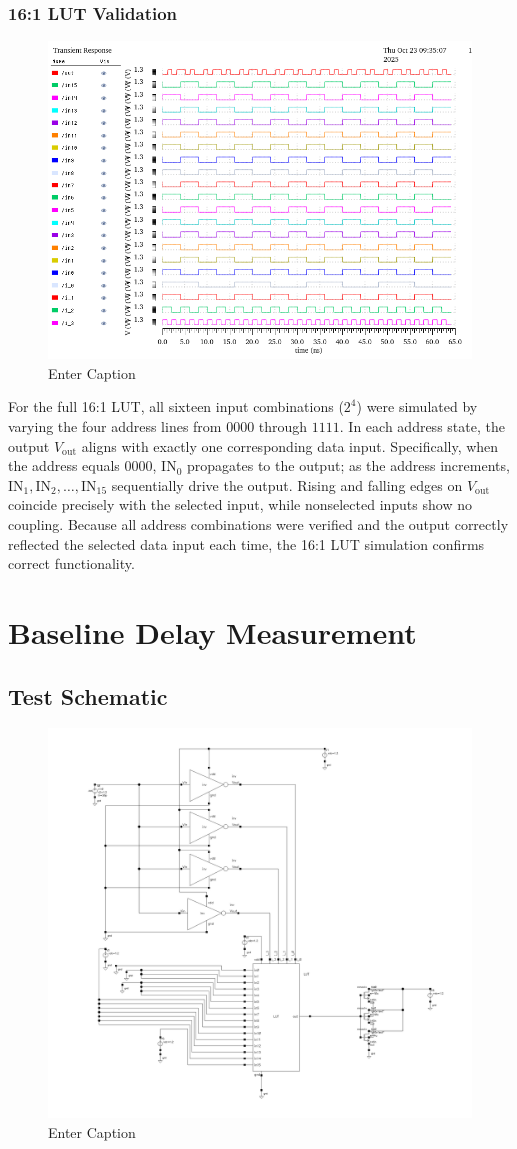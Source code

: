 \documentclass[12pt]{article}
\begin{document}
\subsubsection*{16:1 LUT Validation}
\begin{figure}[H]
    \centering
    \includegraphics[width=0.5\linewidth]{writeup//figures/lutval.png}
    \caption{Enter Caption}
\end{figure}

For the full 16:1 LUT, all sixteen input combinations (\(2^4\)) were simulated by varying the four address lines from \(0000\) through \(1111\). 
In each address state, the output \(V_{\text{out}}\) aligns with exactly one corresponding data input. 
Specifically, when the address equals \(0000\), \(\text{IN}_0\) propagates to the output; as the address increments, \(\text{IN}_1, \text{IN}_2, \ldots, \text{IN}_{15}\) sequentially drive the output. 
Rising and falling edges on \(V_{\text{out}}\) coincide precisely with the selected input, while nonselected inputs show no coupling. 
Because all address combinations were verified and the output correctly reflected the selected data input each time, the 16:1 LUT simulation confirms correct functionality.

\newpage

\section{Baseline Delay Measurement}
\subsection{Test Schematic}

\begin{figure}[H]
    \centering
    \includegraphics[width=0.5\linewidth]{writeup//figures/lut_delay_testbench.png}
    \caption{Enter Caption}
\end{figure}
\end{document}
